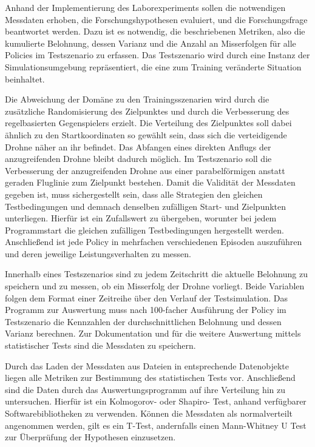 Anhand der Implementierung des Laborexperiments sollen die notwendigen Messdaten erhoben, die Forschungshypothesen evaluiert, und die Forschungsfrage beantwortet werden. %
Dazu ist es notwendig, die beschriebenen Metriken, also die kumulierte Belohnung, dessen Varianz und die Anzahl an Misserfolgen für alle Policies im Testszenario zu erfassen.
Das Testszenario wird durch eine Instanz der Simulationsumgebung repräsentiert, die eine zum Training veränderte Situation beinhaltet. %

Die Abweichung der Domäne zu den Trainingsszenarien wird durch die zusätzliche Randomisierung des Zielpunktes und durch die Verbesserung des regelbasierten Gegenspielers erzielt. 
Die Verteilung des Zielpunktes soll dabei ähnlich zu den Startkoordinaten so gewählt sein, dass sich die verteidigende Drohne näher an ihr befindet.
Das Abfangen eines direkten Anflugs der anzugreifenden Drohne bleibt dadurch möglich.
Im Testszenario soll die Verbesserung der anzugreifenden Drohne aus einer parabelförmigen anstatt geraden Fluglinie zum Zielpunkt bestehen.
Damit die Validität der Messdaten gegeben ist, muss sichergestellt sein, dass alle Strategien den gleichen Testbedingungen und demnach denselben zufälligen Start- und Zielpunkten unterliegen.
Hierfür ist ein Zufallswert zu übergeben, worunter bei jedem Programmstart die gleichen zufälligen Testbedingungen hergestellt werden. %
Anschließend ist jede Policy in mehrfachen verschiedenen Episoden auszuführen und deren jeweilige Leistungsverhalten zu messen.

Innerhalb eines Testszenarios sind zu jedem Zeitschritt die aktuelle Belohnung zu speichern und zu messen, ob ein Misserfolg der Drohne vorliegt.
Beide Variablen folgen dem Format einer Zeitreihe über den Verlauf der Testsimulation.
Das Programm zur Auswertung muss nach 100-facher Ausführung der Policy im Testszenario die Kennzahlen der durchschnittlichen Belohnung und dessen Varianz berechnen.
Zur Dokumentation und für die weitere Auswertung mittels statistischer Tests sind die Messdaten zu speichern.

Durch das Laden der Messdaten aus Dateien in entsprechende Datenobjekte liegen alle Metriken zur Bestimmung des statistischen Tests vor.
Anschließend sind die Daten durch das Auswertungsprogramm auf ihre Verteilung hin zu untersuchen.
Hierfür ist ein Kolmogorov- oder Shapiro- Test, anhand verfügbarer Softwarebibliotheken zu verwenden. %
Können die Messdaten als normalverteilt angenommen werden, gilt es ein T-Test, andernfalls einen Mann-Whitney U Test zur Überprüfung der Hypothesen einzusetzen. %

